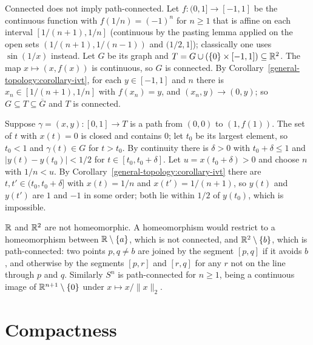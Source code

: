 \begin{counterexample}\label{general-topology:counterexample-sine-curve}
Connected does not imply path-connected. Let $f \colon (0, 1] \to [-1, 1]$ be the continuous function with $f(1/n) = (-1)^n$ for $n \geq 1$ that is
affine on each interval $[1/(n+1), 1/n]$ (continuous by the pasting lemma applied on the open sets $(1/(n+1), 1/(n-1))$ and $(1/2, 1]$); classically one
uses $\sin(1/x)$ instead. Let $G$ be its graph and $T = G \cup (\{0\} \times [-1, 1]) \subseteq \mathbb{R}^2$. The map $x \mapsto (x, f(x))$ is continuous, so $G$ is
connected. By Corollary~\ref{general-topology:corollary-ivt}, for each $y \in [-1, 1]$ and $n$ there is $x_n \in [1/(n+1), 1/n]$ with $f(x_n) = y$, and
$(x_n, y) \to (0, y)$; so $G \subseteq T \subseteq \overline{G}$ and $T$ is connected.

Suppose $\gamma = (x, y) \colon [0, 1] \to T$ is a path from $(0, 0)$ to $(1, f(1))$. The set of $t$ with $x(t) = 0$ is closed and contains $0$; let $t_0$ be
its largest element, so $t_0 < 1$ and $\gamma(t) \in G$ for $t > t_0$. By continuity there is $\delta > 0$ with $t_0 + \delta \leq 1$ and
$|y(t) - y(t_0)| < 1/2$ for $t \in [t_0, t_0 + \delta]$. Let $u = x(t_0 + \delta) > 0$ and choose $n$ with $1/n < u$. By
Corollary~\ref{general-topology:corollary-ivt} there are $t, t' \in (t_0, t_0 + \delta]$ with $x(t) = 1/n$ and $x(t') = 1/(n+1)$, so $y(t)$ and $y(t')$
are $1$ and $-1$ in some order; both lie within $1/2$ of $y(t_0)$, which is impossible.
\end{counterexample}

\begin{example}\label{general-topology:example-r-not-r2}
$\mathbb{R}$ and $\mathbb{R}^2$ are not homeomorphic. A homeomorphism would restrict to a homeomorphism between $\mathbb{R} \setminus \{a\}$, which is not connected, and
$\mathbb{R}^2 \setminus \{b\}$, which is path-connected: two points $p, q \neq b$ are joined by the segment $[p, q]$ if it avoids $b$, and otherwise by the segments
$[p, r]$ and $[r, q]$ for any $r$ not on the line through $p$ and $q$. Similarly $S^n$ is path-connected for $n \geq 1$, being a continuous image of
$\mathbb{R}^{n+1} \setminus \{0\}$ under $x \mapsto x/\|x\|_2$.
\end{example}

\section{Compactness}\label{general-topology:section-compactness}

